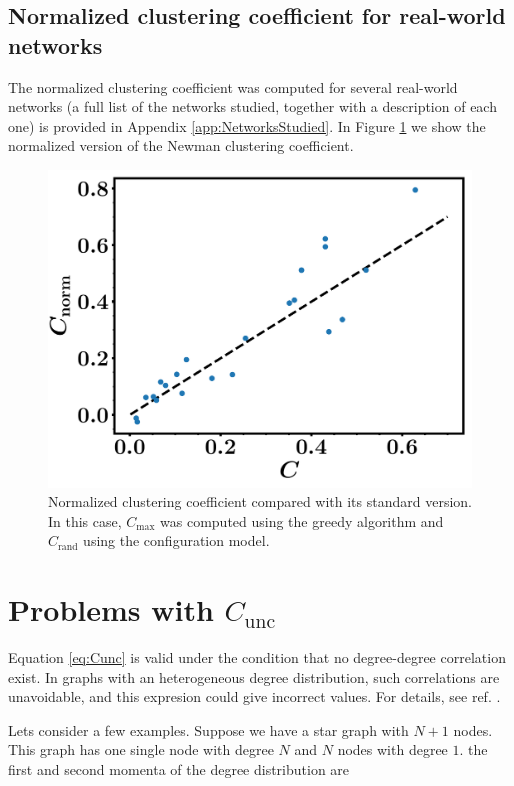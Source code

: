 \documentclass{article}
\begin{document}
\subsection{Normalized clustering coefficient for real-world networks}

The normalized clustering coefficient was computed for several real-world networks (a full list of the networks studied, together with a description of each one) is provided in Appendix \ref{app:NetworksStudied}. In Figure \ref{fig:Cnorm_vs_C} we show the normalized version of the Newman clustering coefficient.

\begin{figure}[ht!]
\centering
\includegraphics[scale=0.4]{./figs/Cnorm_vs_C}
\caption{Normalized clustering coefficient compared with its standard version. In this case, $C_{\mathrm{max}}$ was computed using the greedy algorithm and $C_{\mathrm{rand}}$ using the configuration model.}
\label{fig:Cnorm_vs_C}
\end{figure}

\appendix
\section{Problems with $C_{\mathrm{unc}}$} \label{app:Cunc}

Equation \ref{eq:Cunc} is valid under the condition that no degree-degree correlation exist. In graphs with an heterogeneous degree distribution, such correlations are unavoidable, and this expresion could give incorrect values. For details, see ref. \cite{Newman2003WhyNetworks}.

Lets consider a few examples. Suppose we have a star graph with $N+1$ nodes. This graph has one single node with degree $N$ and $N$ nodes with degree $1$. the first and second momenta of the degree distribution are 
\end{document}
